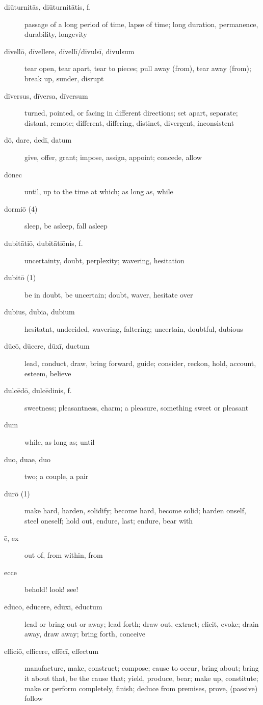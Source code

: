 \begin{description}
    \item[diūturnitās, diūturnitātis, f.] passage of a long period of time, lapse of time; long duration, permanence, durability, longevity
    \item[dīvellō, dīvellere, dīvellī/dīvulsī, divulsum] tear open, tear apart, tear to pieces; pull away (from), tear away (from); break up, sunder, disrupt
    \item[dīversus, dīversa, dīversum] turned, pointed, or facing in different directions; set apart, separate; distant, remote; different, differing, distinct, divergent, inconsistent
    \item[dō, dare, dedī, datum] give, offer, grant; impose, assign, appoint; concede, allow
    \item[dōnec] until, up to the time at which; as long as, while
    \item[dormiō (4)] sleep, be asleep, fall asleep
    \item[dubitātiō, dubitātiōnis, f.] uncertainty, doubt, perplexity; wavering, hesitation
    \item[dubitō (1)] be in doubt, be uncertain; doubt, waver, hesitate over
    \item[dubius, dubia, dubium] hesitatnt, undecided, wavering, faltering; uncertain, doubtful, dubious
    \item[dūcō, dūcere, dūxī, ductum] lead, conduct, draw, bring forward, guide; consider, reckon, hold, account, esteem, believe
    \item[dulcēdō, dulcēdinis, f.] sweetness; pleasantness, charm; a pleasure, something sweet or pleasant
    \item[dum] while, as long as; until
    \item[duo, duae, duo] two; a couple, a pair
    \item[dūrō (1)] make hard, harden, solidify; become hard, become solid; harden onself, steel oneself; hold out, endure, last; endure, bear with
    \item[ē, ex] out of, from within, from
    \item[ecce] behold! look! see!
    \item[ēdūcō, ēdūcere, ēdūxī, ēductum] lead or bring out or away; lead forth; draw out, extract; elicit, evoke; drain away, draw away; bring forth, conceive
    \item[efficiō, efficere, effēcī, effectum] manufacture, make, construct; compose; cause to occur, bring about; bring it about that, be the cause that; yield, produce, bear; make up, constitute; make or perform completely, finish; deduce from premises, prove, (passive) follow

\end{description}
